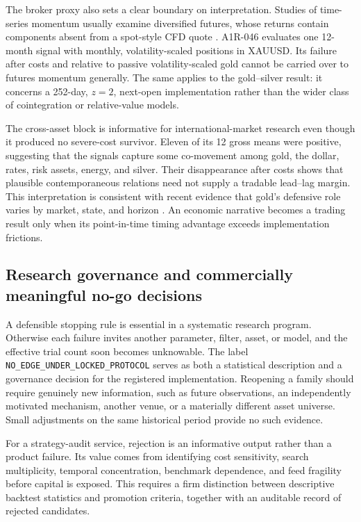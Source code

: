 The broker proxy also sets a clear boundary on interpretation. Studies of time-series momentum usually examine diversified futures, whose returns contain components absent from a spot-style CFD quote \citep{moskowitz2012,hurst2017}. A1R-046 evaluates one 12-month signal with monthly, volatility-scaled positions in XAUUSD. Its failure after costs and relative to passive volatility-scaled gold cannot be carried over to futures momentum generally. The same applies to the gold--silver result: it concerns a 252-day, $z=2$, next-open implementation rather than the wider class of cointegration or relative-value models.

The cross-asset block is informative for international-market research even though it produced no severe-cost survivor. Eleven of its 12 gross means were positive, suggesting that the signals capture some co-movement among gold, the dollar, rates, risk assets, energy, and silver. Their disappearance after costs shows that plausible contemporaneous relations need not supply a tradable lead--lag margin. This interpretation is consistent with recent evidence that gold's defensive role varies by market, state, and horizon \citep{gurdgiev2024,ryan2024,faraj2025,xu2026}. An economic narrative becomes a trading result only when its point-in-time timing advantage exceeds implementation frictions.

\subsection{Research governance and commercially meaningful no-go decisions}

A defensible stopping rule is essential in a systematic research program. Otherwise each failure invites another parameter, filter, asset, or model, and the effective trial count soon becomes unknowable. The label \texttt{NO\_EDGE\_UNDER\_LOCKED\_PROTOCOL} serves as both a statistical description and a governance decision for the registered implementation. Reopening a family should require genuinely new information, such as future observations, an independently motivated mechanism, another venue, or a materially different asset universe. Small adjustments on the same historical period provide no such evidence.

For a strategy-audit service, rejection is an informative output rather than a product failure. Its value comes from identifying cost sensitivity, search multiplicity, temporal concentration, benchmark dependence, and feed fragility before capital is exposed. This requires a firm distinction between descriptive backtest statistics and promotion criteria, together with an auditable record of rejected candidates.

